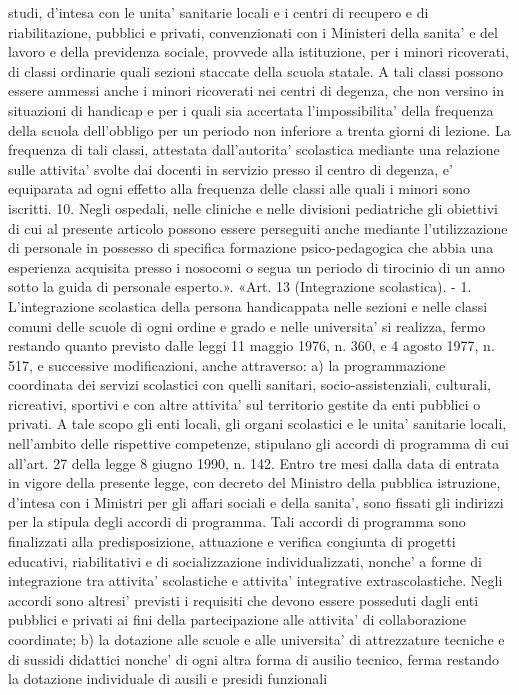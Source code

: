     studi, d'intesa con le unita' sanitarie locali e i centri di recupero e di riabilitazione, pubblici e privati, convenzionati con i Ministeri della sanita' e del lavoro e della previdenza sociale, provvede alla istituzione, per i minori ricoverati, di classi ordinarie quali sezioni staccate della scuola statale. A tali classi possono essere ammessi anche i minori ricoverati nei centri di degenza, che non versino in situazioni di handicap e per i quali sia accertata l'impossibilita' della frequenza della scuola dell'obbligo per un periodo non inferiore a trenta giorni di lezione. La frequenza di tali classi, attestata dall'autorita' scolastica mediante una relazione sulle attivita' svolte dai docenti in servizio presso il centro di degenza, e' equiparata ad ogni effetto alla frequenza delle classi alle quali i minori sono iscritti. 10. Negli ospedali, nelle cliniche e nelle divisioni pediatriche gli obiettivi di cui al presente articolo possono essere perseguiti anche mediante l'utilizzazione di personale in possesso di specifica formazione psico-pedagogica che abbia una esperienza acquisita presso i nosocomi o segua un periodo di tirocinio di un anno sotto la guida di personale esperto.». «Art. 13 (Integrazione scolastica). - 1. L'integrazione scolastica della persona handicappata nelle sezioni e nelle classi comuni delle scuole di ogni ordine e grado e nelle universita' si realizza, fermo restando quanto previsto dalle leggi 11 maggio 1976, n. 360, e 4 agosto 1977, n.
    517, e successive modificazioni, anche attraverso: a) la programmazione coordinata dei servizi scolastici con quelli sanitari, socio-assistenziali, culturali, ricreativi, sportivi e con altre attivita' sul territorio gestite da enti pubblici o privati. A tale scopo gli enti locali, gli organi scolastici e le unita' sanitarie locali, nell'ambito delle rispettive competenze, stipulano gli accordi di programma di cui all'art. 27 della legge 8 giugno 1990, n. 142. Entro tre mesi dalla data di entrata in vigore della presente legge, con decreto del Ministro della pubblica istruzione, d'intesa con i Ministri per gli affari sociali e della sanita', sono fissati gli indirizzi per la stipula degli accordi di programma. Tali accordi di programma sono finalizzati alla predisposizione, attuazione e verifica congiunta di progetti educativi,
    riabilitativi e di socializzazione individualizzati, nonche' a forme di integrazione tra attivita' scolastiche e attivita' integrative extrascolastiche. Negli accordi sono altresi' previsti i requisiti che devono essere posseduti dagli enti pubblici e privati ai fini della partecipazione alle attivita' di collaborazione coordinate; b) la dotazione alle scuole e alle universita' di attrezzature tecniche e di sussidi didattici nonche' di ogni altra forma di ausilio tecnico, ferma restando la dotazione individuale di ausili e presidi funzionali

